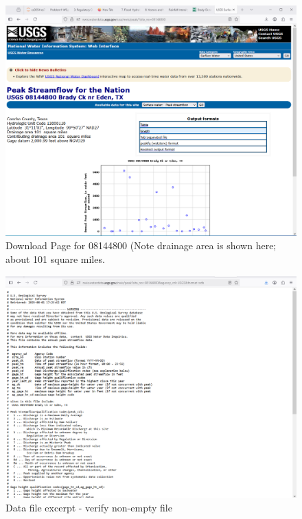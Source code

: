 \documentclass[12pt]{article}
\begin{document}
\begin{enumerate}
\begin{figure}[h!] %
   \centering
   \includegraphics[width=7in]{DownloadPage.png} 
   \caption{Download Page for 08144800 (Note drainage area is shown here; about 101 square miles.}
   \label{fig:DownloadPage.png}
\end{figure}

\begin{figure}[h!] %
   \centering
   \includegraphics[width=7in]{brady-eden.png} 
   \caption{Data file excerpt - verify non-empty file}
   \label{fig:brady-eden}
\end{figure}


\end{enumerate}
\end{document}
